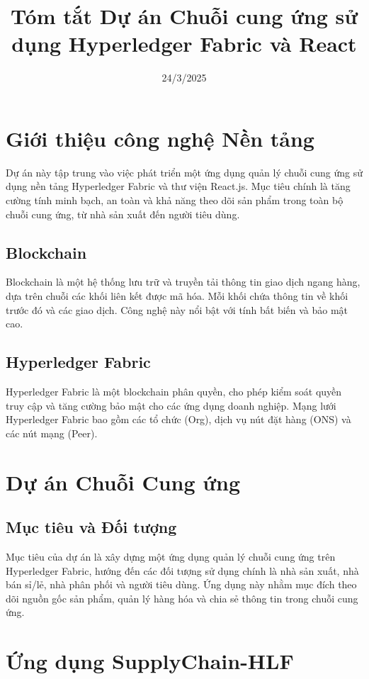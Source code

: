 \documentclass[a4paper,12pt]{article}
\title{\textbf{Tóm tắt Dự án Chuỗi cung ứng sử dụng Hyperledger Fabric và React}}
\date{24/3/2025}
\begin{document}
\maketitle

\section{Giới thiệu công nghệ Nền tảng}

Dự án này tập trung vào việc phát triển một ứng dụng quản lý chuỗi cung ứng sử dụng nền tảng Hyperledger Fabric và thư viện React.js. Mục tiêu chính là tăng cường tính minh bạch, an toàn và khả năng theo dõi sản phẩm trong toàn bộ chuỗi cung ứng, từ nhà sản xuất đến người tiêu dùng.
\subsection{Blockchain}
Blockchain là một hệ thống lưu trữ và truyền tải thông tin giao dịch ngang hàng, dựa trên chuỗi các khối liên kết được mã hóa. Mỗi khối chứa thông tin về khối trước đó và các giao dịch. Công nghệ này nổi bật với tính bất biến và bảo mật cao.

\subsection{Hyperledger Fabric}

Hyperledger Fabric là một blockchain phân quyền, cho phép kiểm soát quyền truy cập và tăng cường bảo mật cho các ứng dụng doanh nghiệp. Mạng lưới Hyperledger Fabric bao gồm các tổ chức (Org), dịch vụ nút đặt hàng (ONS) và các nút mạng (Peer).

\section{Dự án Chuỗi Cung ứng}

\subsection{Mục tiêu và Đối tượng}

Mục tiêu của dự án là xây dựng một ứng dụng quản lý chuỗi cung ứng trên Hyperledger Fabric, hướng đến các đối tượng sử dụng chính là nhà sản xuất, nhà bán sỉ/lẻ, nhà phân phối và người tiêu dùng. Ứng dụng này nhằm mục đích theo dõi nguồn gốc sản phẩm, quản lý hàng hóa và chia sẻ thông tin trong chuỗi cung ứng.

\section{Ứng dụng SupplyChain-HLF}
\end{document}
